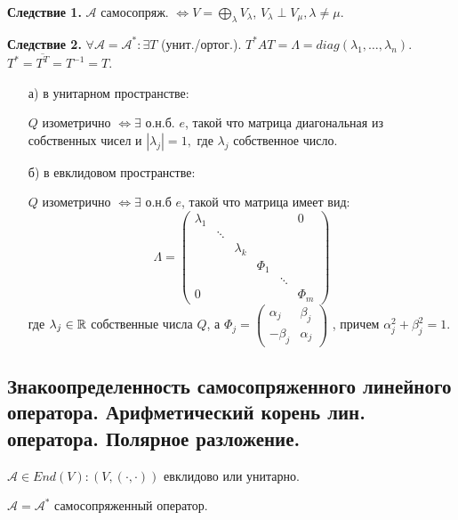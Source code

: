 \textbf{Следствие 1.} $\mathcal{A}$ самосопряж. $\Leftrightarrow V=\bigoplus\limits_{\lambda}V_\lambda$, $V_\lambda \perp V_\mu, \lambda \neq \mu$.

\textbf{Следствие 2.} $\forall \mathcal{A} = \mathcal{A}^*: \exists T$ (унит./ортог.). $T^* AT = \Lambda = diag(\lambda_1,\ldots, \lambda_n)$. $T^*= \overline{T^T}=T^{-1}=T$.


\begin{enumerate}
    \item[а)] в унитарном пространстве:

    $Q$ изометрично $\Leftrightarrow \exists$ о.н.б. $e$, такой что матрица диагональная из собственных чисел и $|\lambda_j|=1,$ где $\lambda_j$ собственное число.

      \item[б)] в евклидовом пространстве:

      $Q$ изометрично $\Leftrightarrow \exists$ о.н.б $e$, такой что матрица имеет вид:
      $$\Lambda = \begin{pmatrix}
    \lambda_1 & & & & &0\\
    & \ddots & & & &\\
    & & \lambda_k & & &\\
    & & & \Phi_1 & &\\
    & & & & \ddots & \\
    0& & & & & \Phi_m
\end{pmatrix}$$
где $\lambda_j \in \mathbb{R}$ собственные числа $Q$, а $\Phi_j = \begin{pmatrix}
    \alpha_j & \beta_j\\
    -\beta_j &\alpha_j
\end{pmatrix}$
, причем $\alpha_j^2 + \beta_j^2 = 1$.
    
\end{enumerate}

\pagebreak
\subsection{Знакоопределенность самосопряженного линейного оператора. Арифметический корень лин. оператора. Полярное разложение.}

 $\mathcal{A} \in End(V): (V, (\cdot,\cdot))$ евклидово или унитарно.

$\mathcal{A} = \mathcal{A}^*$ самосопряженный оператор. 

